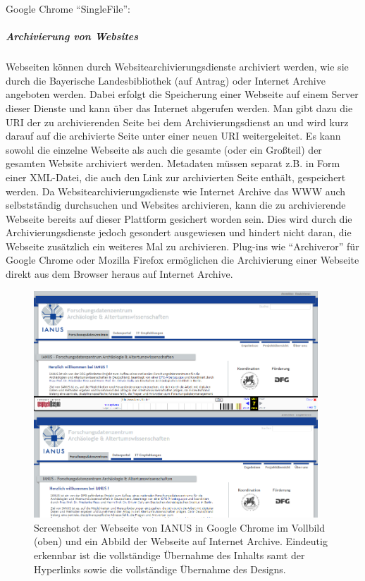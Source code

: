 \begin{flushleft}
	Google Chrome "`SingleFile"': 
\end{flushleft}

\subparagraph{Archivierung von Websites}
Webseiten können durch Websitearchivierungsdienste archiviert werden, wie sie durch die Bayerische Landesbibliothek (auf Antrag) oder Internet Archive angeboten werden. Dabei erfolgt die Speicherung einer Webseite auf einem Server dieser Dienste und kann über das Internet abgerufen werden. Man gibt dazu die URI der zu archivierenden Seite  bei dem Archivierungsdienst an und wird kurz darauf auf die archivierte Seite unter einer neuen URI weitergeleitet. Es kann sowohl die einzelne Webseite als auch die gesamte (oder ein Großteil) der gesamten Website archiviert werden. Metadaten müssen separat z.B. in Form einer XML-Datei, die auch den Link zur archivierten Seite enthält, gespeichert werden. Da Websitearchivierungsdienste wie Internet Archive das WWW auch selbstständig durchsuchen und Websites archivieren, kann die zu archivierende Webseite bereits auf dieser Plattform gesichert worden sein. Dies wird durch die Archivierungsdienste jedoch gesondert ausgewiesen und hindert nicht daran, die Webseite zusätzlich ein weiteres Mal zu archivieren. Plug-ins wie "`Archiveror"' für Google Chrome oder Mozilla Firefox ermöglichen die Archivierung einer Webseite direkt aus dem Browser heraus auf Internet Archive. 

\begin{figure}[h!tb]
  \begin{center}
    \includegraphics[width=0.95\textwidth]{bilder/web_wayback}
  \end{center}
  \caption{Screenshot der Webseite von IANUS in Google Chrome im Vollbild (oben) und ein Abbild der Webseite auf Internet Archive. Eindeutig erkennbar ist die vollständige Übernahme des Inhalts samt der Hyperlinks sowie die vollständige Übernahme des Designs.}
\end{figure}

